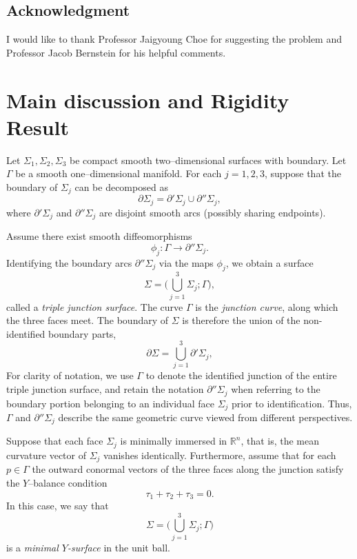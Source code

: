 \documentclass[11pt]{amsart}
\numberwithin{equation}{section}
\theoremstyle{theorem}
\theoremstyle{definition}
\numberwithin{equation}{section}
\begin{document}
\subsection*{Acknowledgment} I would like to thank Professor Jaigyoung Choe for suggesting the problem and Professor Jacob Bernstein for his helpful comments.


\section{Main discussion and Rigidity Result} 
Let $\Sigma_1,\Sigma_2,\Sigma_3$ be compact smooth two–dimensional surfaces with boundary.
Let $\Gamma$ be a smooth one–dimensional manifold.
For each $j=1,2,3$, suppose that the boundary of $\Sigma_j$ can be decomposed as
\[
\partial\Sigma_j=\partial'\Sigma_j\cup\partial''\Sigma_j,
\]
where $\partial'\Sigma_j$ and $\partial''\Sigma_j$ are disjoint smooth arcs (possibly sharing endpoints).

Assume there exist smooth diffeomorphisms
\[
\phi_j:\Gamma\to\partial''\Sigma_j .
\]
Identifying the boundary arcs $\partial''\Sigma_j$ via the maps $\phi_j$, we obtain a surface
\[
\Sigma=\Big(\bigcup_{j=1}^3\Sigma_j;\Gamma\Big),
\]
called a \emph{triple junction surface}. The curve $\Gamma$ is the \emph{junction curve}, along which the three faces meet. The boundary of $\Sigma$ is therefore the union of the non-identified boundary parts,
\[
\partial \Sigma = \bigcup_{j=1}^3 \partial' \Sigma_j,
\]
For clarity of notation, we use $\Gamma$ to denote the identified junction of the entire triple junction surface, and retain the notation $\partial'' \Sigma_j$ when referring to the boundary portion belonging to an individual face $\Sigma_j$ prior to identification. Thus, $\Gamma$ and $\partial'' \Sigma_j$ describe the same geometric curve viewed from different perspectives.
\medskip

Suppose that each face $\Sigma_j$ is minimally immersed in $\mathbb{R}^n$, that is,
the mean curvature vector of $\Sigma_j$ vanishes identically. Furthermore, assume that
for each $p\in\Gamma$ the outward conormal vectors of the three faces along the junction
satisfy the $Y$–balance condition
\[
\tau_1+\tau_2+\tau_3=0 .
\] 
In this case, we say that 
\[
\Sigma = \Big(\bigcup_{j=1}^3 \Sigma_j; \Gamma \Big)
\]
is a \emph{minimal $Y$-surface} in the unit ball.
\end{document}
